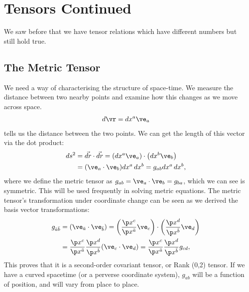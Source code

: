 \documentclass[a4paper, 11pt, normalem]{report}
\begin{document}
\chapter{Tensors Continued}
We saw before that we have tensor relations which have different numbers but still hold true. 

\section{The Metric Tensor}
We need a way of characterising the structure of space-time.
We measure the distance between two nearby points and examine how this changes as we move across space. 
\begin{align}
    d\vr = dx^a\ve_a
\end{align}
tells us the distance between the two points. 
We can get the length of this vector via the dot product:
\begin{align}
    \begin{split}
        ds^2 &= \vec{dr}\cdot\vec{dr} = \left(dx^a\ve_a\right)\cdot\left(dx^b\ve_b\right) \\
             &= (\ve_a\cdot\ve_b)dx^a\,dx^b = g_{ab}dx^a\,dx^b,
    \end{split}
\end{align}
where we define the metric tensor as $g_{ab} = \ve_a\cdot\ve_b = g_{ba}$, which we can see is symmetric.
This will be used frequently in solving metric equations.
The metric tensor's transformation under coordinate change can be seen as we derived the basis vector transformations:
\begin{align}
    \begin{split}
        g_{\bar{a}\bar{b}} &= (\ve_{\bar{a}}\cdot\ve_{\bar{b}}) = \left(\frac{\p x^c}{\p x^{\bar{a}}}\ve_c\right)\cdot\left(\frac{\p x^{d}}{\p x^{\bar{b}}}\ve_d\right) \\
                           &= \frac{\p x^c}{\p x^{\bar{a}}}\frac{\p x^d}{\p x^{\bar{b}}}(\ve_c\cdot\ve_d) = \frac{\p x^c}{\p x^{\bar{a}}}\frac{\p x^d}{\p x^{\bar{b}}}g_{cd},
    \end{split}
\end{align}
This proves that it is a second-order covariant tensor, or Rank (0,2) tensor.
If we have a curved spacetime (or a perverse coordinate system), $g_{ab}$ will be a function of position, and will vary from place to place.
\end{document}
